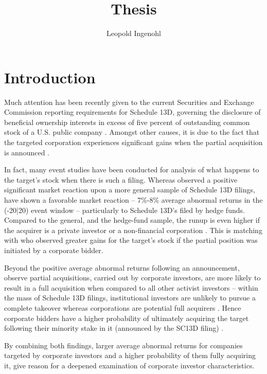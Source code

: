 \documentclass[12pt]{article}
\title{Thesis}
\author{Leopold Ingenohl}
\begin{document}
\maketitle

\section{Introduction}
Much attention has been recently given to the current Securities and Exchange Commission reporting requirements for Schedule 13D, governing the disclosure of beneficial ownership interests in excess of five percent of outstanding common stock of a U.S. public company \citep{Giglia2018}. Amongst other causes, it is due to the fact that the targeted corporation experiences significant gains when the partial acquisition is announced \citep{Akhigbe2007}. %

In fact, many event studies have been conducted for analysis of what happens to the target's stock when there is such a filing. Whereas \citet{Collin-Dufresne2015} observed a positive significant market reaction upon a more general sample of Schedule 13D filings, \citet{Brav2008} have shown a favorable market reaction -- 7\%-8\% average abnormal returns in the (-20|20) event window -- particularly to Schedule 13D's filed by hedge funds. Compared to the general, and the hedge-fund sample, the runup is even higher if the acquirer is a private investor or a non-financial corporation \citep{Brigida2012}. This is matching with \citet{Akhigbe2007} who observed greater gains for the target's stock if the partial position was initiated by a corporate bidder. 

Beyond the positive average abnormal returns following an announcement, \citet{Akhigbe2007} observe partial acquisitions, carried out by corporate investors, are more likely to result in a full acquisition when compared to all other activist investors -- within the mass of Schedule 13D filings, institutional investors are unlikely to pursue a complete takeover whereas corporations are potential full acquirers \citep{Brigida2012}. Hence corporate bidders have a higher probability of ultimately acquiring the target following their minority stake in it (announced by the SC13D filing) \citep{Greenwood2009}. 

By combining both findings, larger average abnormal returns for companies targeted by corporate investors and a higher probability of them fully acquiring it, give reason for a deepened examination of corporate investor characteristics. 
\end{document}
